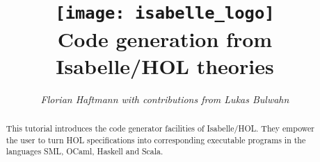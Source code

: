 \documentclass[12pt,a4paper,fleqn]{article}
\title{\texttt{[image: isabelle\_logo]}
  \\[4ex] Code generation from Isabelle/HOL theories}
\author{\emph{Florian Haftmann with contributions from Lukas Bulwahn}}
\begin{document}
\maketitle

\begin{abstract}
  \noindent This tutorial introduces the code generator facilities of Isabelle/HOL.
    They empower the user to turn HOL specifications into corresponding executable
    programs in the languages SML, OCaml, Haskell and Scala.
\end{abstract}

\thispagestyle{empty}\clearpage

\clearfirst










\begingroup
 \small\raggedright\frenchspacing

\endgroup
\end{document}

